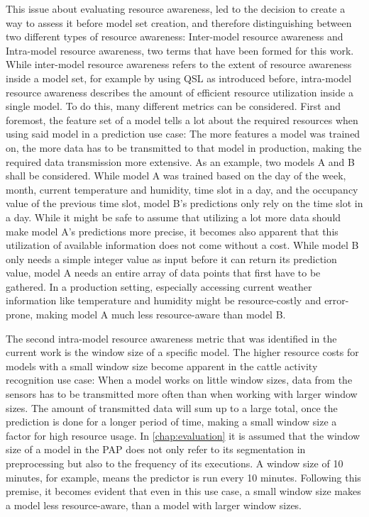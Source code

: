 This issue about evaluating resource awareness, led to the decision to create a way to assess it before model set creation, and therefore distinguishing between two different types of resource awareness: Inter-model resource awareness and Intra-model resource awareness, two terms that have been formed for this work. While inter-model resource awareness refers to the extent of resource awareness inside a model set, for example by using QSL as introduced before, intra-model resource awareness describes the amount of efficient resource utilization inside a single model. To do this, many different metrics can be considered. First and foremost, the feature set of a model tells a lot about the required resources when using said model in a prediction use case: The more features a model was trained on, the more data has to be transmitted to that model in production, making the required data transmission more extensive. As an example, two models A and B shall be considered. While model A was trained based on the day of the week, month, current temperature and humidity, time slot in a day, and the occupancy value of the previous time slot, model B's predictions only rely on the time slot in a day. While it might be safe to assume that utilizing a lot more data should make model A’s predictions more precise, it becomes also apparent that this utilization of available information does not come without a cost. While model B only needs a simple integer value as input before it can return its prediction value, model A needs an entire array of data points that first have to be gathered. In a production setting, especially accessing current weather information like temperature and humidity might be resource-costly and error-prone, making model A much less resource-aware than model B. 

The second intra-model resource awareness metric that was identified in the current work is the window size of a specific model. The higher resource costs for models with a small window size become apparent in the cattle activity recognition use case: When a model works on little window sizes, data from the sensors has to be transmitted more often than when working with larger window sizes. The amount of transmitted data will sum up to a large total, once the prediction is done for a longer period of time, making a small window size a factor for high resource usage. In \autoref{chap:evaluation} it is assumed that the window size of a model in the PAP does not only refer to its segmentation in preprocessing but also to the frequency of its executions. A window size of 10 minutes, for example, means the predictor is run every 10 minutes. Following this premise, it becomes evident that even in this use case, a small window size makes a model less resource-aware, than a model with larger window sizes. 

